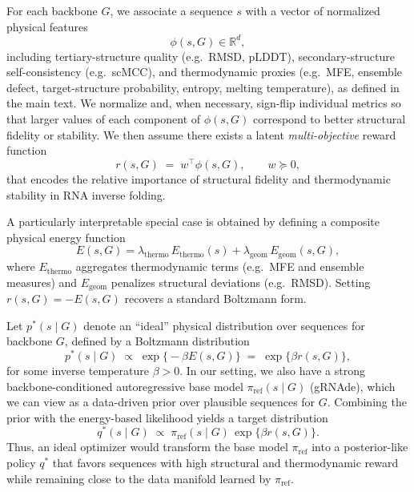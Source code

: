 {{For each backbone $G$, we associate a sequence $s$ with a vector of normalized
physical features
\begin{equation}
    \phi(s, G) \in \mathbb{R}^d,
\end{equation}
including tertiary-structure quality (e.g.\ RMSD, pLDDT), secondary-structure
self-consistency (e.g.\ scMCC), and thermodynamic proxies (e.g.\ MFE,
ensemble defect, target-structure probability, entropy, melting temperature),
as defined in the main text. We normalize and, when necessary, sign-flip
individual metrics so that larger values of each component of
$\phi(s,G)$ correspond to better structural fidelity or stability. We then
assume there exists a latent \emph{multi-objective} reward function
\begin{equation}
    r(s, G) \;=\; w^\top \phi(s, G),
    \qquad w \succeq 0,
    \label{eq:latent-reward}
\end{equation}
that encodes the relative importance of structural fidelity and
thermodynamic stability in RNA inverse folding.

A particularly interpretable special case is obtained by defining a composite
physical energy function
\begin{equation}
    E(s, G)
    =
    \lambda_{\text{thermo}} \, E_{\text{thermo}}(s)
    +
    \lambda_{\text{geom}} \, E_{\text{geom}}(s, G),
\end{equation}
where $E_{\text{thermo}}$ aggregates thermodynamic terms (e.g.\ MFE and
ensemble measures) and $E_{\text{geom}}$ penalizes structural deviations
(e.g.\ RMSD). Setting $r(s,G) = -E(s,G)$ recovers a standard Boltzmann form.

Let $p^*(s \mid G)$ denote an ``ideal'' physical distribution over sequences
for backbone $G$, defined by a Boltzmann distribution
\begin{equation}
    p^*(s \mid G)
    \;\propto\;
    \exp\bigl\{-\beta E(s, G)\bigr\}
    \;=\;
    \exp\bigl\{\beta r(s, G)\bigr\},
    \label{eq:boltzmann-physical}
\end{equation}
for some inverse temperature $\beta > 0$.
In our setting, we also have a strong backbone-conditioned autoregressive
base model $\pi_{\text{ref}}(s \mid G)$ (gRNAde), which we can view as a
data-driven prior over plausible sequences for $G$. Combining the prior
with the energy-based likelihood yields a target distribution
\begin{equation}
    q^*(s \mid G)
    \;\propto\;
    \pi_{\text{ref}}(s \mid G)\,\exp\bigl\{\beta r(s, G)\bigr\}.
    \label{eq:target-posterior}
\end{equation}
Thus, an ideal optimizer would transform the base model $\pi_{\text{ref}}$
into a posterior-like policy $q^*$ that favors sequences with high
structural and thermodynamic reward while remaining close to the data
manifold learned by $\pi_{\text{ref}}$.

}}
